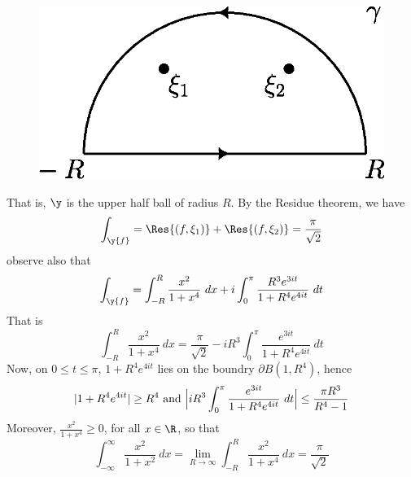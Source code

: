 \begin{example}
\begin{enumerate}
        \begin{figure}[h]
            \centering
            \includegraphics[scale=0.5]{Figures/chapter5/contour_1.eps}
            \caption{}
            \label{figure_5.3}
        \end{figure}
        That is, $\y$ is the upper half ball of radius $R$. By the Residue
        theorem, we have
        \begin{equation*}
            \int_\y{f}=\Res{(f,\xi_1)}+\Res{(f,\xi_2)}= \frac{\pi}{\sqrt{2}}
        \end{equation*}
        observe also that
        \begin{equation*}
            \int_\y{f}=\int_{-R}^R{\frac{x^2}{1+x^4} \ dx}+
            i\int_0^\pi{\frac{R^3e^{3it}}{1+R^4e^{4it}} \ dt}
       \end{equation*}
       That is
        \begin{equation*}
            \int_{-R}^R{\frac{x^2}{1+x^4} \ dx}=\frac{\pi}{\sqrt{2}}-
            iR^3\int_0^\pi{\frac{e^{3it}}{1+R^4e^{4it}} \ dt}
       \end{equation*}
       Now, on $0 \leq t \leq \pi$, $1+R^4e^{4it}$ lies on the boundry
       $\partial{B(1,R^4)}$, hence
       \begin{equation*}
           |1+R^4e^{4it}| \geq R^4 \text{ and }
           \Big{|} iR^3\int_0^\pi{\frac{e^{3it}}{1+R^4e^{4it}} \ dt} \Big{|}
           \leq \frac{\pi{R^3}}{R^4-1}
       \end{equation*}
       Moreover, $\frac{x^2}{1+x^4} \geq 0$, for all $x \in \R$, so that
       \begin{equation*}
           \int_{-\infty}^\infty{\frac{x^2}{1+x^2} \ dx}=
           \lim_{R \xrightarrow{} \infty}{\int_{-R}^R{\frac{x^2}{1+x^4} \ dx}}=
           \frac{\pi}{\sqrt{2}}
       \end{equation*}


\end{enumerate}
\end{example}
